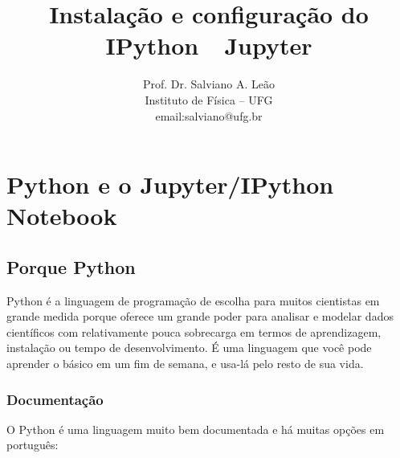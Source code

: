 \documentclass[11pt]{article}
\title{Instalação e configuração do IPython~\textfractionsolidus~Jupyter}
\author{Prof. Dr. Salviano A. Leão\\
         Instituto de Física -- UFG\\
            email:salviano@ufg.br}
\begin{document}

\maketitle

\tableofcontents

\section{Python e o Jupyter/IPython Notebook}\label{python-e-o-jupyteripython-notebook}

\subsection{Porque Python}\label{porque-python}

Python é a linguagem de programação de escolha para muitos cientistas em
grande medida porque oferece um grande poder para analisar e modelar
dados científicos com relativamente pouca sobrecarga em termos de
aprendizagem, instalação ou tempo de desenvolvimento. É uma linguagem
que você pode aprender o básico em um fim de semana, e usa-lá pelo resto
de sua vida.

\subsubsection{Documentação}\label{documentauxe7uxe3o}

O Python é uma linguagem muito bem documentada e há muitas opções em
português:
\end{document}
